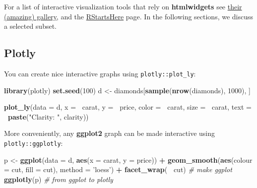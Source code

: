 \documentclass[]{book}
\newenvironment{Shaded}{\begin{snugshade}}{\end{snugshade}}
\newcommand{\KeywordTok}[1]{\textcolor[rgb]{0.13,0.29,0.53}{\textbf{#1}}}
\newcommand{\DataTypeTok}[1]{\textcolor[rgb]{0.13,0.29,0.53}{#1}}
\newcommand{\DecValTok}[1]{\textcolor[rgb]{0.00,0.00,0.81}{#1}}
\newcommand{\StringTok}[1]{\textcolor[rgb]{0.31,0.60,0.02}{#1}}
\newcommand{\CommentTok}[1]{\textcolor[rgb]{0.56,0.35,0.01}{\textit{#1}}}
\newcommand{\OperatorTok}[1]{\textcolor[rgb]{0.81,0.36,0.00}{\textbf{#1}}}
\newcommand{\NormalTok}[1]{#1}
\theoremstyle{definition}
\theoremstyle{definition}
\theoremstyle{definition}
\theoremstyle{remark}
\begin{document}
For a list of interactive visualization tools that rely on
\textbf{htmlwidgets} see \href{http://gallery.htmlwidgets.org/}{their
(amazing) gallery}, and the
\href{https://github.com/rstudio/RStartHere}{RStartsHere} page. In the
following sections, we discuss a selected subset.

\subsection{Plotly}\label{plotly}

You can create nice interactive graphs using \texttt{plotly::plot\_ly}:

\begin{Shaded}
\begin{Highlighting}[]
\KeywordTok{library}\NormalTok{(plotly)}
\KeywordTok{set.seed}\NormalTok{(}\DecValTok{100}\NormalTok{)}
\NormalTok{d <-}\StringTok{ }\NormalTok{diamonds[}\KeywordTok{sample}\NormalTok{(}\KeywordTok{nrow}\NormalTok{(diamonds), }\DecValTok{1000}\NormalTok{), ]}
\end{Highlighting}
\end{Shaded}

\begin{Shaded}
\begin{Highlighting}[]
\KeywordTok{plot_ly}\NormalTok{(}\DataTypeTok{data =}\NormalTok{ d, }\DataTypeTok{x =} \OperatorTok{~}\NormalTok{carat, }\DataTypeTok{y =} \OperatorTok{~}\NormalTok{price, }\DataTypeTok{color =} \OperatorTok{~}\NormalTok{carat, }\DataTypeTok{size =} \OperatorTok{~}\NormalTok{carat, }\DataTypeTok{text =} \OperatorTok{~}\KeywordTok{paste}\NormalTok{(}\StringTok{"Clarity: "}\NormalTok{, clarity))}
\end{Highlighting}
\end{Shaded}

More conveniently, any \textbf{ggplot2} graph can be made interactive
using \texttt{plotly::ggplotly}:

\begin{Shaded}
\begin{Highlighting}[]
\NormalTok{p <-}\StringTok{ }\KeywordTok{ggplot}\NormalTok{(}\DataTypeTok{data =}\NormalTok{ d, }\KeywordTok{aes}\NormalTok{(}\DataTypeTok{x =}\NormalTok{ carat, }\DataTypeTok{y =}\NormalTok{ price)) }\OperatorTok{+}
\StringTok{  }\KeywordTok{geom_smooth}\NormalTok{(}\KeywordTok{aes}\NormalTok{(}\DataTypeTok{colour =}\NormalTok{ cut, }\DataTypeTok{fill =}\NormalTok{ cut), }\DataTypeTok{method =} \StringTok{'loess'}\NormalTok{) }\OperatorTok{+}\StringTok{ }
\StringTok{  }\KeywordTok{facet_wrap}\NormalTok{(}\OperatorTok{~}\StringTok{ }\NormalTok{cut) }\CommentTok{# make ggplot}
\KeywordTok{ggplotly}\NormalTok{(p) }\CommentTok{# from ggplot to plotly}
\end{Highlighting}
\end{Shaded}
\end{document}
